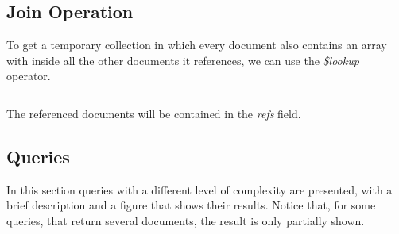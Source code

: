 \documentclass{Configuration_Files/PoliMi3i_thesis}
\begin{document}
\pagebreak
\subsection{Join Operation}
To get a temporary collection in which every document also contains an array with inside all the other documents it references, we can use the \textit{\$lookup} operator.
\inputminted[linenos,tabsize=2,breaklines]{MQL}{code/json/join.txt}
The referenced documents will be contained in the \textit{refs} field.

\subsection{Queries}
In this section queries with a different level of complexity are presented, with a brief description and a figure that shows their results. Notice that, for some queries, that return several documents, the result is only partially shown.
\end{document}

